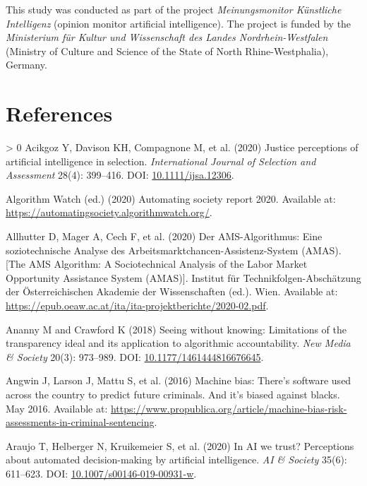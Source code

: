 \documentclass{article}
\newlength{\cslhangindent}
\newenvironment{CSLReferences}[3] %
 {%
  \setlength{\parindent}{0pt}
  \ifodd #1 \everypar{\setlength{\hangindent}{\cslhangindent}}\ignorespaces\fi
  \ifnum #2 > 0
  \setlength{\parskip}{#2\baselineskip}
  \fi
 }%
 {}
\begin{document}
This study was conducted as part of the project \emph{Meinungsmonitor
Künstliche Intelligenz} (opinion monitor artificial intelligence). The
project is funded by the \emph{Ministerium für Kultur und Wissenschaft
des Landes Nordrhein-Westfalen} (Ministry of Culture and Science of the
State of North Rhine-Westphalia), Germany.

\hypertarget{references}{%
\section*{References}\label{references}}

\hypertarget{refs}{}
\begin{CSLReferences}{1}{0}
\leavevmode\hypertarget{ref-Acikgoz.2020}{}%
Acikgoz Y, Davison KH, Compagnone M, et al. (2020) Justice perceptions
of artificial intelligence in selection. \emph{International Journal of
Selection and Assessment} 28(4): 399--416. DOI:
\href{https://doi.org/10.1111/ijsa.12306}{10.1111/ijsa.12306}.

\leavevmode\hypertarget{ref-AlgorithmWatch.2020}{}%
Algorithm Watch (ed.) (2020) Automating society report 2020. Available
at: \url{https://automatingsociety.algorithmwatch.org/}.

\leavevmode\hypertarget{ref-Allhutter.2020}{}%
Allhutter D, Mager A, Cech F, et al. (2020) Der AMS-Algorithmus: Eine
soziotechnische Analyse des Arbeitsmarktchancen-Assistenz-System (AMAS). [The AMS Algorithm: A Sociotechnical Analysis of the Labor Market Opportunity Assistance System (AMAS)].
Institut für Technikfolgen-Abschätzung der Österreichischen Akademie der
Wissenschaften (ed.). Wien. Available at:
\url{https://epub.oeaw.ac.at/ita/ita-projektberichte/2020-02.pdf}.

\leavevmode\hypertarget{ref-Ananny.2018}{}%
Ananny M and Crawford K (2018) Seeing without knowing: Limitations of
the transparency ideal and its application to algorithmic
accountability. \emph{New Media {\&} Society} 20(3): 973--989. DOI:
\href{https://doi.org/10.1177/1461444816676645}{10.1177/1461444816676645}.

\leavevmode\hypertarget{ref-Angwin.2016}{}%
Angwin J, Larson J, Mattu S, et al. (2016) Machine bias: There's
software used across the country to predict future criminals. And it's
biased against blacks. May 2016. Available at:
\url{https://www.propublica.org/article/machine-bias-risk-assessments-in-criminal-sentencing}.

\leavevmode\hypertarget{ref-Araujo.2020}{}%
Araujo T, Helberger N, Kruikemeier S, et al. (2020) In AI we trust?
Perceptions about automated decision-making by artificial intelligence.
\emph{AI {\&} Society} 35(6): 611--623. DOI:
\href{https://doi.org/10.1007/s00146-019-00931-w}{10.1007/s00146-019-00931-w}.


\end{CSLReferences}
\end{document}

